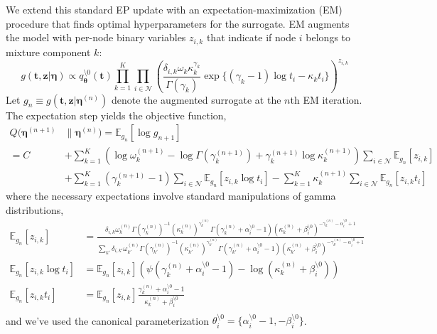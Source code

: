 \documentclass{article}
\begin{document}
We extend this standard EP update with an expectation-maximization (EM) 
procedure that finds optimal hyperparameters for the surrogate. 
EM augments the model with per-node binary variables $z_{i,k}$ 
that indicate if node $i$ belongs to mixture component $k$: 
\[
  g(\bm t, \bm z | \bm \eta) \propto q_{\bm \theta}^{\setminus 0}(\bm t) \prod_{k=1}^K \prod_{i \in \mathcal{N}} \left( \frac{\delta_{i,k} \omega_{k} \kappa_k^{\gamma_k}}{\Gamma(\gamma_k)}\exp\{(\gamma_k - 1) \log t_i - \kappa_k t_i\} \right)^{z_{i,k}}
\]
Let $g_n \equiv g(\bm t, \bm z | \bm \eta^{(n)})$ denote the augmented surrogate at the $n$th EM iteration. 
The expectation step yields the objective function,
\[
  \begin{aligned}
    Q(\bm \eta^{(n+1)} & \parallel \bm \eta^{(n)}) = \mathbb{E}_{g_n}[\log g_{n+1}] \\
    = C & + \sum_{k=1}^K (\log \omega_k^{(n+1)} - \log \Gamma(\gamma_k^{(n+1)}) + \gamma_k^{(n+1)} \log \kappa_k^{(n+1)} )\sum_{i \in \mathcal{N}} \mathbb{E}_{g_n}[z_{i,k}] \\
  & + \sum_{k=1}^K (\gamma_k^{(n+1)} - 1) \sum_{i \in \mathcal{N}} \mathbb{E}_{g_n}[z_{i,k} \log t_i] - \sum_{k=1}^K \kappa^{(n+1)}_k \sum_{i \in \mathcal{N}} \mathbb{E}_{g_n}[z_{i,k} t_i] 
  \end{aligned}
\]
where the necessary expectations involve standard manipulations of gamma distributions,
\[
  \begin{aligned}
    \mathbb{E}_{g_n}[z_{i,k}] & = \frac{ \delta_{i,k} \omega_k^{(n)} \Gamma(\gamma_k^{(n)})^{-1} (\kappa_k^{(n)})^{\gamma_k^{(n)}} \Gamma(\gamma_k^{(n)} + \alpha_i^{\setminus 0} - 1) (\kappa_k^{(n)} + \beta^{\setminus 0}_i)^{-\gamma_k^{(n)} - \alpha_i^{\setminus 0} + 1} }{ \sum_{k'} \delta_{i,k'} \omega_{k'}^{(n)} \Gamma(\gamma_{k'}^{(n)})^{-1} (\kappa_{k'}^{(n)})^{\gamma_{k'}^{(n)}} \Gamma(\gamma_{k'}^{(n)} + \alpha_i^{\setminus 0} - 1) (\kappa_{k'}^{(n)} + \beta^{\setminus 0}_i)^{-\gamma_{k'}^{(n)} - \alpha_i^{\setminus 0} + 1} }\\
    \mathbb{E}_{g_n}[z_{i,k} \log t_i] & = \mathbb{E}_{g_n}[z_{i,k}] \left(\psi(\gamma^{(n)}_k + \alpha_i^{\setminus 0} - 1) - \log(\kappa^{(n)}_k + \beta_i^{\setminus 0}) \right) \\
    \mathbb{E}_{g_n}[z_{i,k} t_i] & = \mathbb{E}_{g_n}[z_{i,k}] \frac{\gamma^{(n)}_k + \alpha_i^{\setminus 0} - 1}{\kappa^{(n)}_k + \beta_i^{\setminus 0}} \\
  \end{aligned}
\]
and we've used the canonical parameterization 
$\theta_i^{\setminus 0} = \{\alpha^{\setminus 0}_i - 1, -\beta^{\setminus 0}_i \}$. 
\end{document}
